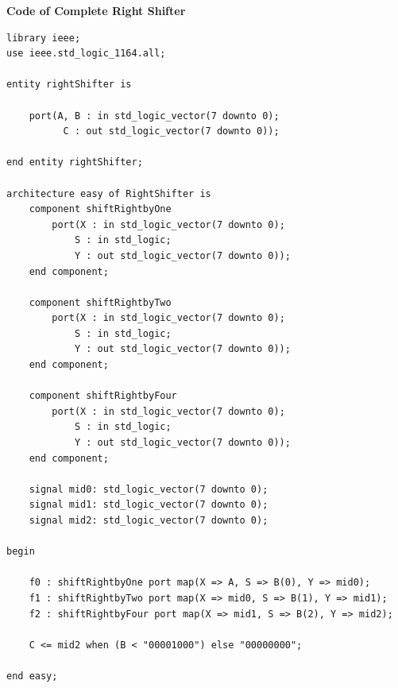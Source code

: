 \documentclass[12pt]{article}
\begin{document}
        \noindent
        \textbf{Code of Complete Right Shifter}
        \noindent
        \begin{verbatim}
library ieee;
use ieee.std_logic_1164.all;

entity rightShifter is

	port(A, B : in std_logic_vector(7 downto 0);
		  C : out std_logic_vector(7 downto 0));
		  
end entity rightShifter;

architecture easy of RightShifter is
	component shiftRightbyOne
		port(X : in std_logic_vector(7 downto 0);
		 	S : in std_logic;
		  	Y : out std_logic_vector(7 downto 0));
	end component;

	component shiftRightbyTwo
		port(X : in std_logic_vector(7 downto 0);
		 	S : in std_logic;
		  	Y : out std_logic_vector(7 downto 0));
	end component;

	component shiftRightbyFour
		port(X : in std_logic_vector(7 downto 0);
		 	S : in std_logic;
		  	Y : out std_logic_vector(7 downto 0));
	end component;

	signal mid0: std_logic_vector(7 downto 0);
	signal mid1: std_logic_vector(7 downto 0);
	signal mid2: std_logic_vector(7 downto 0);

begin

	f0 : shiftRightbyOne port map(X => A, S => B(0), Y => mid0);
	f1 : shiftRightbyTwo port map(X => mid0, S => B(1), Y => mid1);
	f2 : shiftRightbyFour port map(X => mid1, S => B(2), Y => mid2);

	C <= mid2 when (B < "00001000") else "00000000";

end easy;
        \end{verbatim}

\end{document}
